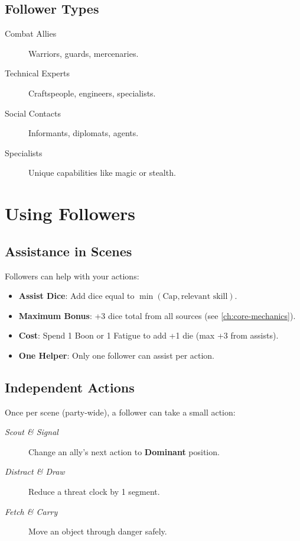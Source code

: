 \subsection*{Follower Types}
\label{sec:follower-types}
\begin{description}
\item[Combat Allies] Warriors, guards, mercenaries.
\item[Technical Experts] Craftspeople, engineers, specialists.
\item[Social Contacts] Informants, diplomats, agents.
\item[Specialists] Unique capabilities like magic or stealth.
\end{description}

\section{Using Followers}
\label{sec:using-followers}

\subsection*{Assistance in Scenes}
\label{sec:follower-assistance}
Followers can help with your actions:
\begin{itemize}
\item \textbf{Assist Dice}: Add dice equal to $\min(\text{Cap}, \text{relevant skill})$.
\item \textbf{Maximum Bonus}: +3 dice total from all sources (see \ref{ch:core-mechanics}).
\item \textbf{Cost}: Spend 1 Boon or 1 Fatigue to add +1 die (max +3 from assists).
\item \textbf{One Helper}: Only one follower can assist per action.
\end{itemize}

\subsection*{Independent Actions}
\label{sec:follower-independent}
Once per scene (party‑wide), a follower can take a small action:
\begin{description}
\item[\emph{Scout \& Signal}] Change an ally’s next action to \textbf{Dominant} position.
\item[\emph{Distract \& Draw}] Reduce a threat clock by 1 segment.
\item[\emph{Fetch \& Carry}] Move an object through danger safely.
\end{description}

